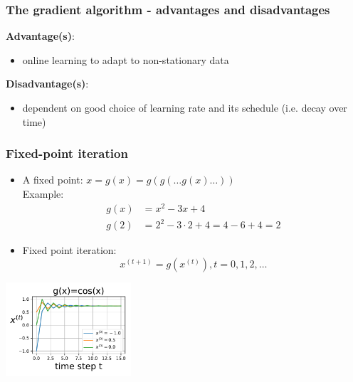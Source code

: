 \begin{frame}
\frametitle{The gradient algorithm - advantages and disadvantages}
\textbf{Advantage(s)}:
\pause
\begin{itemize}
\item online learning to adapt to non-stationary data
\end{itemize}
\textbf{Disadvantage(s)}:
\pause
\begin{itemize}
\item dependent on good choice of learning rate and its schedule (i.e. decay over time)
\end{itemize}

\end{frame}

\subsubsection{Fixed-point iteration}

\begin{frame}{\subsubsecname}

\begin{itemize}
\item A fixed point: $x=g(x)=g(g(\ldots g(x)\ldots))$\\

Example:
\begin{align}
    g(x) &= x^{2} - 3x + 4\\
    g(2) &= 2^{2} - 3\cdot 2 + 4 = 4 - 6 + 4 = 2
\end{align}

\item Fixed point iteration:
\begin{equation}
x^{(t+1)} = g(x^{(t)}), t=0,1,2,\ldots
\end{equation}
\end{itemize}

\begin{center}
    \includegraphics[height=3.5cm]{img/fixed_point_iter_cos} 
\end{center}

\end{frame}

